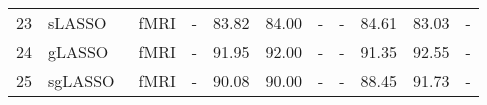 \begin{table*}
\begin{tabular}{l|l|l|l|lllllll}
   
23                                      & sLASSO~\cite{2015Toward}                      & fMRI                                               & -                                            & 83.82                        & 84.00                        & -                             & -                          & 84.61                           & 83.03                           & -                       \\
24                                      & gLASSO~\cite{2015Toward}                      & fMRI                                               & -                                            & 91.95                        & 92.00                        & -                             & -                          & 91.35                           & 92.55                           & -                       \\
25                                     & sgLASSO~\cite{2015Toward}                     & fMRI                                               & -                                            & 90.08                        & 90.00                        & -                             & -                          & 88.45                           & 91.73                           & -                       \\
\hline 
\end{tabular}
\end{table*}


\ifx\allfiles\undefined

\fi 